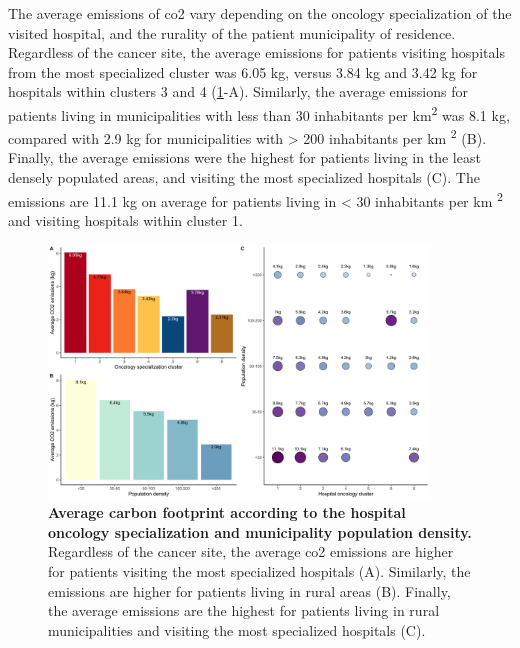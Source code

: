 The average emissions of \ac{co2} vary depending on the oncology specialization
of the visited hospital, and the rurality of the patient municipality of
residence. Regardless of the cancer site, the average emissions for patients
visiting hospitals from the most specialized cluster was 6.05 kg, versus 3.84 kg
and 3.42 kg for hospitals within clusters 3 and 4
(\cref{fig:avg-carbon-footprint-density-cluster}-A). Similarly, the average
emissions for patients living in municipalities with less than 30 inhabitants
per km\textsuperscript{2} was 8.1 kg, compared with 2.9 kg for municipalities
with > 200 inhabitants per km \textsuperscript{2}
(B). Finally, the average emissions were the highest for patients living
in the least densely populated areas, and visiting the most specialized
hospitals (C). The emissions are 11.1 kg on average for patients living in
< 30 inhabitants per km \textsuperscript{2} and visiting hospitals within
cluster 1.

\begin{figure}[h!]
    \includegraphics[width=0.9\textwidth]{images/routes/sup_fig_5.png}
    \centering
    \caption{ \textbf{Average carbon footprint according to the hospital
            oncology specialization and municipality population density.} Regardless
        of the cancer site, the average \ac{co2} emissions are higher for
        patients visiting the most specialized hospitals (A). Similarly,
        the emissions are higher for patients living in rural areas (B).
        Finally, the average emissions are the highest for patients living in
        rural municipalities and visiting the most specialized hospitals (C).}
    \label{fig:avg-carbon-footprint-density-cluster}
\end{figure}

